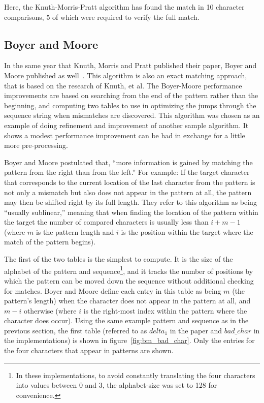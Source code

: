 Here, the Knuth-Morris-Pratt algorithm has found the match in 10 character comparisons, 5 of which were required to verify the full match.

\subsection{Boyer and Moore}

In the same year that Knuth, Morris and Pratt published their paper, Boyer and Moore published as well~\cite{boyer}. This algorithm is also an exact matching approach, that is based on the research of Knuth, et al. The Boyer-Moore performance improvements are based on searching from the end of the pattern rather than the beginning, and computing two tables to use in optimizing the jumps through the sequence string when mismatches are discovered. This algorithm was chosen as an example of doing refinement and improvement of another sample algorithm. It shows a modest performance improvement can be had in exchange for a little more pre-processing.

Boyer and Moore postulated that, ``more information is gained by matching the pattern from the right than from the left.'' For example: If the target character that corresponds to the current location of the last character from the pattern is not only a mismatch but also does not appear in the pattern at all, the pattern may then be shifted right by its full length. They refer to this algorithm as being ``usually sublinear,'' meaning that when finding the location of the pattern within the target the number of compared characters is usually less than $i+m-1$ (where $m$ is the pattern length and $i$ is the position within the target where the match of the pattern begins).

The first of the two tables is the simplest to compute. It is the size of the alphabet of the pattern and sequence\footnote{In these implementations, to avoid constantly translating the four characters into values between 0 and 3, the alphabet-size was set to 128 for convenience.}, and it tracks the number of positions by which the pattern can be moved down the sequence without additional checking for matches. Boyer and Moore define each entry in this table as being $m$ (the pattern's length) when the character does not appear in the pattern at all, and $m - i$ otherwise (where $i$ is the right-most index within the pattern where the character does occur). Using the same example pattern and sequence as in the previous section, the first table (referred to as $delta_1$ in the paper and $bad\_char$ in the implementations) is shown in figure~\ref{fig:bm_bad_char}. Only the entries for the four characters that appear in patterns are shown.

